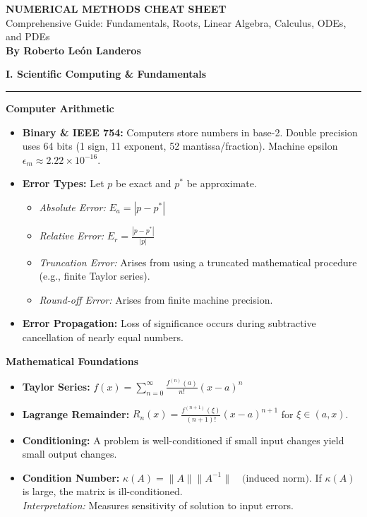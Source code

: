 \documentclass[10pt, landscape, twocolumn]{article}
\newcommand{\cheatsheetsection}[1]{
    \vspace{0.6em}
    {\color{themeblue}\large\bfseries #1} \par
    \vspace{-0.5em}
    {\color{themeblue}\rule{\linewidth}{1pt}} \par
    \vspace{0.2em}
}
\newcommand{\cheatsheetsubsection}[1]{
    \vspace{0.4em}
    {\color{themeblue}\normalsize\bfseries #1} \par
    \vspace{0.1em}
}
\begin{document}
\begin{center}
    \vspace{-1em}
    {\color{themeblue}\huge\bfseries NUMERICAL METHODS CHEAT SHEET}\\[0.8em]
    {\color{themegray}\small Comprehensive Guide: Fundamentals, Roots, Linear Algebra, Calculus, ODEs, and PDEs}\\[0.4em]
    {\color{themegray}\footnotesize \textbf{By Roberto León Landeros}}
\end{center}
\vspace{-0.5em}

\cheatsheetsection{I. Scientific Computing \& Fundamentals}

\cheatsheetsubsection{Computer Arithmetic}
\begin{itemize}[leftmargin=*, nosep]
    \item \textbf{Binary \& IEEE 754:} Computers store numbers in base-2. Double precision uses 64 bits (1 sign, 11 exponent, 52 mantissa/fraction). Machine epsilon $\epsilon_m \approx 2.22 \times 10^{-16}$.
    \item \textbf{Error Types:} Let $p$ be exact and $p^*$ be approximate.
    \begin{itemize}[leftmargin=*, nosep]
        \item \textit{Absolute Error:} $E_a = |p - p^*|$
        \item \textit{Relative Error:} $E_r = \frac{|p - p^*|}{|p|}$
        \item \textit{Truncation Error:} Arises from using a truncated mathematical procedure (e.g., finite Taylor series).
        \item \textit{Round-off Error:} Arises from finite machine precision.
    \end{itemize}
    \item \textbf{Error Propagation:} Loss of significance occurs during subtractive cancellation of nearly equal numbers.
\end{itemize}

\cheatsheetsubsection{Mathematical Foundations}
\begin{itemize}[leftmargin=*, nosep]
    \item \textbf{Taylor Series:} $f(x) = \sum_{n=0}^{\infty} \frac{f^{(n)}(a)}{n!}(x-a)^n$
    \item \textbf{Lagrange Remainder:} $R_n(x) = \frac{f^{(n+1)}(\xi)}{(n+1)!}(x-a)^{n+1}$ for $\xi \in (a,x)$. 
    \item \textbf{Conditioning:} A problem is well-conditioned if small input changes yield small output changes.
    \item \textbf{Condition Number:} $\kappa(A) = \|A\| \|A^{-1}\| \quad \text{(induced norm)}$. If $\kappa(A)$ is large, the matrix is ill-conditioned. \\
    \textit{Interpretation:} Measures sensitivity of solution to input errors.
\end{itemize}
\end{document}
